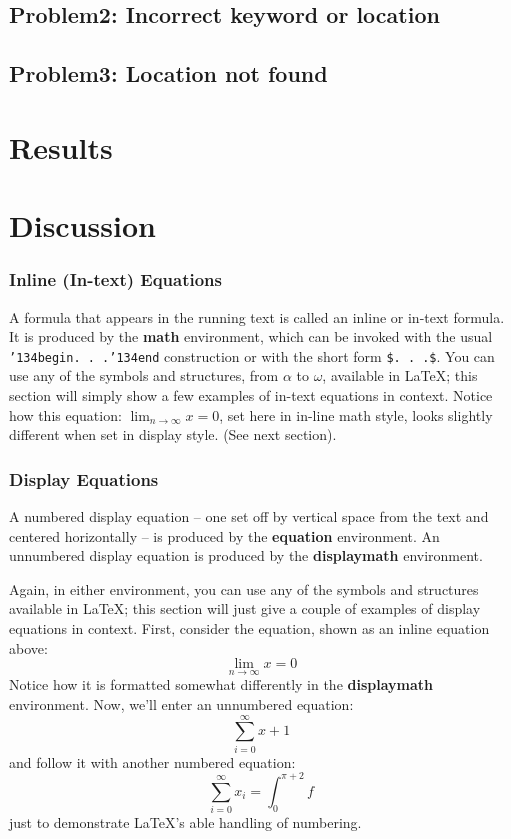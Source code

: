 \documentclass{acm_proc_article-sp}
\begin{document}
\subsection{Problem2: Incorrect keyword or location}
\subsection{Problem3: Location not found}

\section{Results}
\section{Discussion}

\subsubsection{Inline (In-text) Equations}
A formula that appears in the running text is called an
inline or in-text formula.  It is produced by the
\textbf{math} environment, which can be
invoked with the usual \texttt{{\char'134}begin. . .{\char'134}end}
construction or with the short form \texttt{\$. . .\$}. You
can use any of the symbols and structures,
from $\alpha$ to $\omega$, available in
\LaTeX\cite{Lamport:LaTeX}; this section will simply show a
few examples of in-text equations in context. Notice how
this equation: \begin{math}\lim_{n\rightarrow \infty}x=0\end{math},
set here in in-line math style, looks slightly different when
set in display style.  (See next section).

\subsubsection{Display Equations}
A numbered display equation -- one set off by vertical space
from the text and centered horizontally -- is produced
by the \textbf{equation} environment. An unnumbered display
equation is produced by the \textbf{displaymath} environment.

Again, in either environment, you can use any of the symbols
and structures available in \LaTeX; this section will just
give a couple of examples of display equations in context.
First, consider the equation, shown as an inline equation above:
\begin{equation}\lim_{n\rightarrow \infty}x=0\end{equation}
Notice how it is formatted somewhat differently in
the \textbf{displaymath}
environment.  Now, we'll enter an unnumbered equation:
\begin{displaymath}\sum_{i=0}^{\infty} x + 1\end{displaymath}
and follow it with another numbered equation:
\begin{equation}\sum_{i=0}^{\infty}x_i=\int_{0}^{\pi+2} f\end{equation}
just to demonstrate \LaTeX's able handling of numbering.
\end{document}

